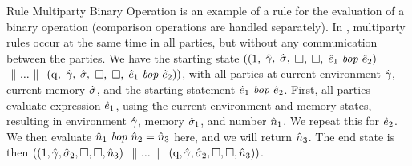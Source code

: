 Rule Multiparty Binary Operation is an example of a rule for the evaluation of a binary operation (comparison operations are handled separately). In \vanillaC, multiparty rules occur at the same time in all parties, but without any communication between the parties. 
We have the starting state $((\mathrm{{1}},$ $\hat{\gamma},$ $\hat{\sigma},$ $\Box,$ $\Box,$ $\hExpr_1\ \binop\ \hExpr_2)$ $\-\ \Vert\  ...\-\ \Vert\  $ $(\mathrm{{q}},$ $\hat{\gamma},$ $\hat{\sigma},$ $\Box,$ $\Box,$ $\hExpr_1\ \binop\ \hExpr_2))$, 
with all parties at current environment $\hat{\gamma}$, current memory $\hat{\sigma}$, and the starting statement $\hat{e}_1\ \mathit{bop}\ \hat{e}_2$.
First, all parties evaluate expression $\hat{e}_1$, using the
current environment and memory states, 
resulting in environment $\hat{\gamma}$, memory
$\hat{\sigma}_1$, and number $\hat{n}_1$.  We repeat this for
$\hat{e}_2$. 
We then evaluate $\hat{n}_1\ \mathit{bop}\ \hat{n}_2 = \hat{n}_3$ here, and we will return $\hat{n}_3$.  
The end state is then
$((\mathrm{{1}}, \hat{\gamma}, \hat{\sigma}_2, \Box, \Box, \hat{n}_3)$ $\-\ \Vert\  ...\-\ \Vert\ $ $(\mathrm{{q}}, \hat{\gamma}, \hat{\sigma}_2, \Box, \Box, \hat{n}_3))$.

































